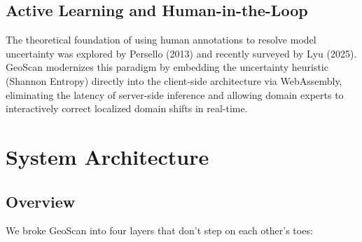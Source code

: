 \documentclass[journal]{IEEEtran}
\begin{document}
\subsection{Active Learning and Human-in-the-Loop}
The theoretical foundation of using human annotations to resolve model uncertainty was explored by Persello (2013) and recently surveyed by Lyu (2025). GeoScan modernizes this paradigm by embedding the uncertainty heuristic (Shannon Entropy) directly into the client-side architecture via WebAssembly, eliminating the latency of server-side inference and allowing domain experts to interactively correct localized domain shifts in real-time.


\section{System Architecture}

\subsection{Overview}

We broke GeoScan into four layers that don't step on each other's toes:
\end{document}
